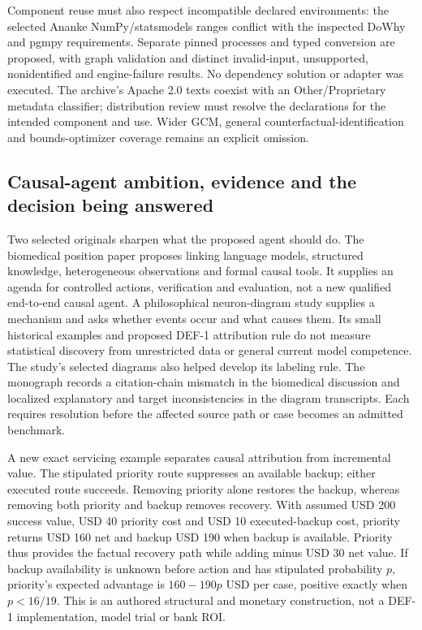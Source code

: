 Component reuse must also respect incompatible declared environments:
the selected Ananke NumPy/statsmodels ranges conflict with the inspected
DoWhy and pgmpy requirements. Separate pinned processes and typed
conversion are proposed, with graph validation and distinct
invalid-input, unsupported, nonidentified and engine-failure results. No
dependency solution or adapter was executed. The archive's Apache 2.0
texts coexist with an Other/Proprietary metadata classifier;
distribution review must resolve the declarations for the intended
component and use. Wider GCM, general counterfactual-identification and
bounds-optimizer coverage remains an explicit omission.
\citep{exec18_pyid_graph,exec18_pyid_metadata,exec18_pyid_license,exec18_pyid_contract}

\hypertarget{causal-agent-ambition-evidence-and-the-decision-being-answered}{%
\subsection{Causal-agent ambition, evidence and the decision being
answered}\label{causal-agent-ambition-evidence-and-the-decision-being-answered}}

Two selected originals sharpen what the proposed agent should do. The
biomedical position paper proposes linking language models, structured
knowledge, heterogeneous observations and formal causal tools. It
supplies an agenda for controlled actions, verification and evaluation,
not a new qualified end-to-end causal agent. A philosophical
neuron-diagram study supplies a mechanism and asks whether events occur
and what causes them. Its small historical examples and proposed DEF-1
attribution rule do not measure statistical discovery from unrestricted
data or general current model competence. The study's selected diagrams
also helped develop its labeling rule. The monograph records a
citation-chain mismatch in the biomedical discussion and localized
explanatory and target inconsistencies in the diagram transcripts. Each
requires resolution before the affected source path or case becomes an
admitted benchmark.
\citep{exec18_reasoning_biomedical,exec18_reasoning_neuron}

A new exact servicing example separates causal attribution from
incremental value. The stipulated priority route suppresses an available
backup; either executed route succeeds. Removing priority alone restores
the backup, whereas removing both priority and backup removes recovery.
With assumed USD 200 success value, USD 40 priority cost and USD 10
executed-backup cost, priority returns USD 160 net and backup USD 190
when backup is available. Priority thus provides the factual recovery
path while adding minus USD 30 net value. If backup availability is
unknown before action and has stipulated probability \(p\), priority's
expected advantage is \(160-190p\) USD per case, positive exactly when
\(p<16/19\). This is an authored structural and monetary construction,
not a DEF-1 implementation, model trial or bank ROI.
\citep{exec18_reasoning_reference}

